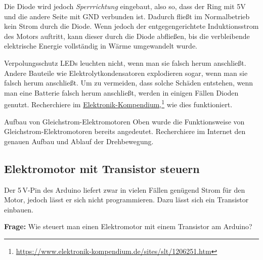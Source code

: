 Die Diode wird jedoch \emph{Sperrrichtung} eingebaut, also so, dass der Ring mit 5V und die andere Seite mit GND verbunden ist. Dadurch fließt im Normalbetrieb kein Strom durch die Diode. Wenn jedoch der entgegengerichtete Induktionsstrom des Motors auftritt, kann dieser durch die Diode abfließen, bis die verbleibende elektrische Energie vollständig in Wärme umgewandelt wurde.

\begin{recherche}{Verpolungsschutz}
	LEDs leuchten nicht, wenn man sie falsch herum anschließt. Andere Bauteile wie Elektrolytkondensatoren explodieren sogar, wenn man sie falsch herum anschließt. Um zu vermeiden, dass solche Schäden entstehen, wenn man eine Batterie falsch herum anschließt, werden in einigen Fällen Dioden genutzt. Recherchiere im \href{https://www.elektronik-kompendium.de/sites/slt/1206251.htm}{Elektronik-Kompendium},\footnote{\url{https://www.elektronik-kompendium.de/sites/slt/1206251.htm}} wie dies funktioniert.
\end{recherche}

\begin{recherche}{Aufbau von Gleichstrom-Elektromotoren}
	Oben wurde die Funktionsweise von Gleichstrom-Elektromotoren bereits angedeutet. Recherchiere im Internet den genauen Aufbau und Ablauf der Drehbewegung. 
\end{recherche}

\newpage
\subsection{Elektromotor mit Transistor steuern}

Der 5\,V-Pin des Arduino liefert zwar in vielen Fällen genügend Strom für den Motor, jedoch lässt er sich nicht programmieren. Dazu lässt sich ein Transistor einbauen.

\begin{ziel}
	\textbf{Frage:} Wie steuert man einen Elektromotor mit einem Transistor am Arduino?
\end{ziel}


